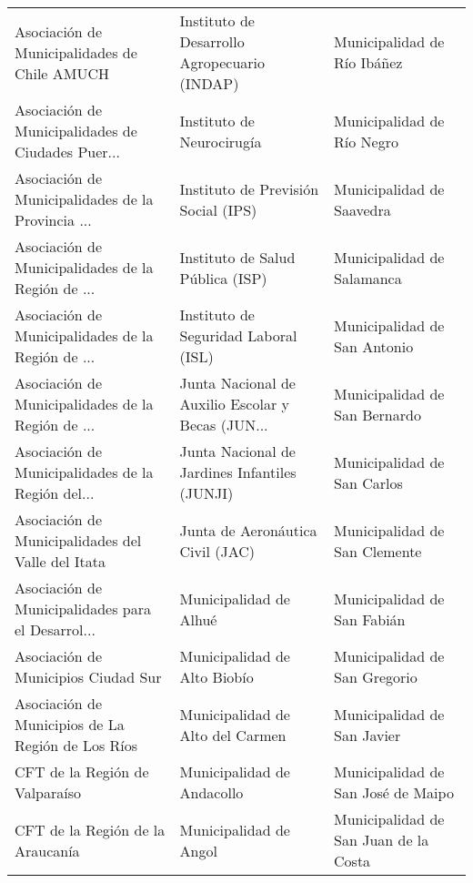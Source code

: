 \documentclass[11pt]{article}
\begin{document}
\begin{longtable}{ p{5cm} | p{5cm} | p{5cm} }
      Asociación de Municipalidades de Chile AMUCH &       Instituto de Desarrollo Agropecuario (INDAP) &                        Municipalidad de Río Ibáñez \\
 Asociación de Municipalidades de Ciudades Puer... &                          Instituto de Neurocirugía &                         Municipalidad de Río Negro \\
 Asociación de Municipalidades de la Provincia ... &                Instituto de Previsión Social (IPS) &                          Municipalidad de Saavedra \\
 Asociación de Municipalidades de la Región de ... &                   Instituto de Salud Pública (ISP) &                         Municipalidad de Salamanca \\
 Asociación de Municipalidades de la Región de ... &               Instituto de Seguridad Laboral (ISL) &                       Municipalidad de San Antonio \\
 Asociación de Municipalidades de la Región de ... &  Junta Nacional de Auxilio Escolar y Becas (JUN... &                      Municipalidad de San Bernardo \\
 Asociación de Municipalidades de la Región del... &      Junta Nacional de Jardines Infantiles (JUNJI) &                        Municipalidad de San Carlos \\
 Asociación de Municipalidades del Valle del Itata &                   Junta de Aeronáutica Civil (JAC) &                      Municipalidad de San Clemente \\
 Asociación de Municipalidades para el Desarrol... &                             Municipalidad de Alhué &                        Municipalidad de San Fabián \\
               Asociación de Municipios Ciudad Sur &                       Municipalidad de Alto Biobío &                      Municipalidad de San Gregorio \\
 Asociación de Municipios de La Región de Los Ríos &                   Municipalidad de Alto del Carmen &                        Municipalidad de San Javier \\
                    CFT de la Región de Valparaíso &                         Municipalidad de Andacollo &                 Municipalidad de San José de Maipo \\
                  CFT de la Región de la Araucanía &                             Municipalidad de Angol &              Municipalidad de San Juan de la Costa \\

\end{longtable}
\end{document}
